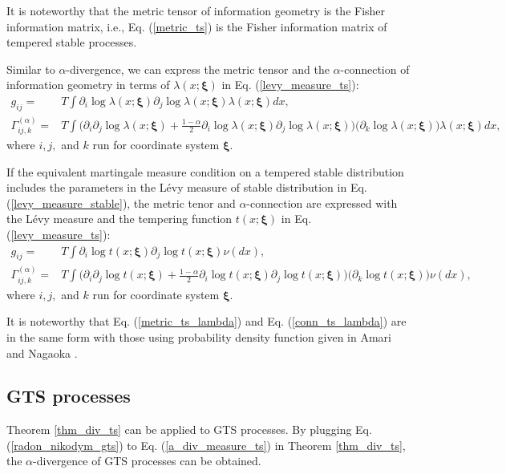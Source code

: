 \documentclass[preprint,11pt]{amsart}
\begin{document}
	It is noteworthy that the metric tensor of information geometry is the Fisher information matrix, i.e., Eq. (\ref{metric_ts}) is the Fisher information matrix of tempered stable processes.
	
	Similar to $\alpha$-divergence, we can express the metric tensor and the $\alpha$-connection of information geometry in terms of $\lambda(x;\boldsymbol{\xi})$ in Eq. (\ref{levy_measure_ts}):
	\begin{align}
	\label{metric_ts_lambda}
		g_{ij}=&T\int \partial_i \log{\lambda(x;\boldsymbol{\xi})} \partial_j \log{\lambda(x;\boldsymbol{\xi})} \lambda(x;\boldsymbol{\xi}) dx,\\
	\label{conn_ts_lambda}
		\Gamma^{(\alpha)}_{ij,k}=&T\int \Big(\partial_i \partial_j \log{\lambda(x;\boldsymbol{\xi})}+\frac{1-\alpha}{2}\partial_i \log{\lambda(x;\boldsymbol{\xi})} \partial_j \log{\lambda(x;\boldsymbol{\xi})}\Big)\Big(\partial_k \log{\lambda(x;\boldsymbol{\xi})}\Big) \lambda(x;\boldsymbol{\xi}) dx,
	\end{align}
	where $i,j,$ and $k$ run for coordinate system $\boldsymbol{\xi}$. 
	
	If the equivalent martingale measure condition on a tempered stable distribution includes the parameters in the L\'evy measure of stable distribution in Eq. (\ref{levy_measure_stable}), the metric tenor and $\alpha$-connection are expressed with the L\'evy measure and the tempering function $t(x;\boldsymbol{\xi})$ in Eq. (\ref{levy_measure_ts}):
	\begin{align}
	\label{metric_ts_t}
		g_{ij}=&T\int \partial_i \log{t(x;\boldsymbol{\xi})} \partial_j \log{t(x;\boldsymbol{\xi})} \nu(dx),\\
	\label{conn_ts_t}
		\Gamma^{(\alpha)}_{ij,k}=&T\int \Big(\partial_i \partial_j \log{t(x;\boldsymbol{\xi})}+\frac{1-\alpha}{2}\partial_i \log{t(x;\boldsymbol{\xi})} \partial_j \log{t(x;\boldsymbol{\xi})}\Big)\Big(\partial_k \log{t(x;\boldsymbol{\xi})}\Big) \nu(dx),
	\end{align}
	where $i,j,$ and $k$ run for coordinate system $\boldsymbol{\xi}$.
	
	It is noteworthy that Eq. (\ref{metric_ts_lambda}) and Eq. (\ref{conn_ts_lambda}) are in the same form with those using probability density function given in Amari and Nagaoka \cite{amari2000methods}.
	
\subsection{GTS processes}
	Theorem \ref{thm_div_ts} can be applied to GTS processes. By plugging Eq. (\ref{radon_nikodym_gts}) to Eq. (\ref{a_div_measure_ts}) in Theorem \ref{thm_div_ts}, the $\alpha$-divergence of GTS processes can be obtained. 
	
\end{document}
